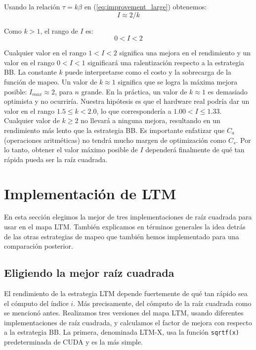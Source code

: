 \documentclass[twocolumn,10pt,a4paper]{article}
\begin{document}
Usando la relación $\tau = k\beta$ en (\ref{eq:improvement_large}) obtenemos:
\begin{equation}
I \approx 2/k
\label{eq:I_approx}
\end{equation}

Como $k > 1$, el rango de $I$ es:
\begin{equation}
0 < I < 2
\label{eq:I_range}
\end{equation}

Cualquier valor en el rango $1 < I < 2$ significa una mejora en el rendimiento
y un valor en el rango $0 < I < 1$ significará una ralentización respecto a la
estrategia BB. La constante $k$ puede interpretarse como el costo y la
sobrecarga de la función de mapeo. Un valor de $k \approx 1$ significa que se
logra la máxima mejora posible: $I_{max} \approx 2$, para $n$ grande. En
la práctica, un valor de $k \approx 1$ es demasiado optimista y no ocurriría.
Nuestra hipótesis es que el hardware real podría dar un valor en el rango
$1.5 \leq k < 2.0$, lo que correspondería a $1.00 < I \leq 1.33$. Cualquier
valor de $k \geq 2$ no llevará a ninguna mejora, resultando en un rendimiento
más lento que la estrategia BB. Es importante enfatizar que $C_a$ (operaciones
aritméticas) no tendrá mucho margen de optimización como $C_s$. Por lo tanto,
obtener el valor máximo posible de $I$ dependerá finalmente de qué tan rápida
pueda ser la raíz cuadrada.

\section{Implementación de LTM}
\label{sec:implementation}

En esta sección elegimos la mejor de tres implementaciones de raíz cuadrada
para usar en el mapa LTM. También explicamos en términos generales la idea
detrás de las otras estrategias de mapeo que también hemos implementado para
una comparación posterior.

\subsection{Eligiendo la mejor raíz cuadrada}

El rendimiento de la estrategia LTM depende fuertemente de qué tan rápido sea
el cómputo del índice $i$. Más precisamente, del cómputo de la raíz cuadrada
como se mencionó antes. Realizamos tres versiones del mapa LTM, usando
diferentes implementaciones de raíz cuadrada, y calculamos el factor de mejora
con respecto a la estrategia BB. La primera, denominada LTM-X, usa la función
\texttt{sqrtf(x)} predeterminada de CUDA y es la más simple.
\end{document}
